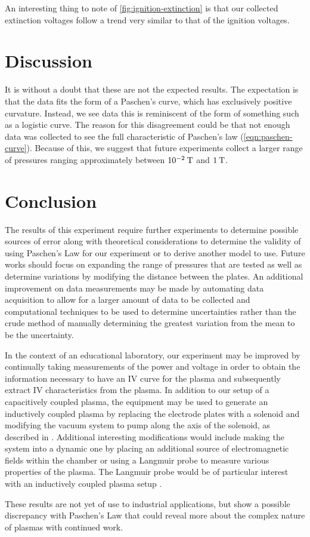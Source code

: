 \documentclass[reprint]{revtex4-1}
\begin{document}
An interesting thing to note of \cref{fig:ignition-extinction} is that our collected extinction voltages follow a trend very similar to that of the ignition voltages.

\section{Discussion}

It is without a doubt that these are not the expected results. The expectation is that the data fits the form of a Paschen's curve, which has exclusively positive curvature. Instead, we see data this is reminiscent of the form of something such as a logistic curve. The reason for this disagreement could be that not enough data was collected to see the full characteristic of Paschen's law (\cref{eqn:paschen-curve}). Because of this, we suggest that future experiments collect a larger range of pressures ranging approximately between $10^{-2}\:\rm{T}$ and $1\:\rm{T}$.


\section{Conclusion}

The results of this experiment require further experiments to determine possible sources of error along with theoretical considerations to determine the validity of using Paschen's Law for our experiment or to derive another model to use. Future works should focus on expanding the range of pressures that are tested as well as determine variations by modifying the distance between the plates. An additional improvement on data measurements may be made by automating data acquisition to allow for a larger amount of data to be collected and computational techniques to be used to determine uncertainties rather than the crude method of manually determining the greatest variation from the mean to be the uncertainty.

In the context of an educational laboratory, our experiment may be improved by continually taking measurements of the power and voltage in order to obtain the information necessary to have an IV curve for the plasma and subsequently extract IV characteristics from the plasma. In addition to our setup of a capacitively coupled plasma,  the equipment may be used to generate an inductively coupled plasma by replacing the electrode plates with a solenoid and modifying the vacuum system to pump along the axis of the solenoid, as described in \cite{physics-radio-frequency,Jiayin2010}. Additional interesting modifications would include making the system into a dynamic one by placing an additional source of electromagnetic fields within the chamber or using a Langmuir probe to measure various properties of the plasma. The Langmuir probe would be of particular interest with an inductively coupled plasma setup \cite{Hopwood1993}.

These results are not yet of use to industrial applications, but show a possible discrepancy with Paschen's Law that could reveal more about the complex nature of plasmas with continued work.


\end{document}
